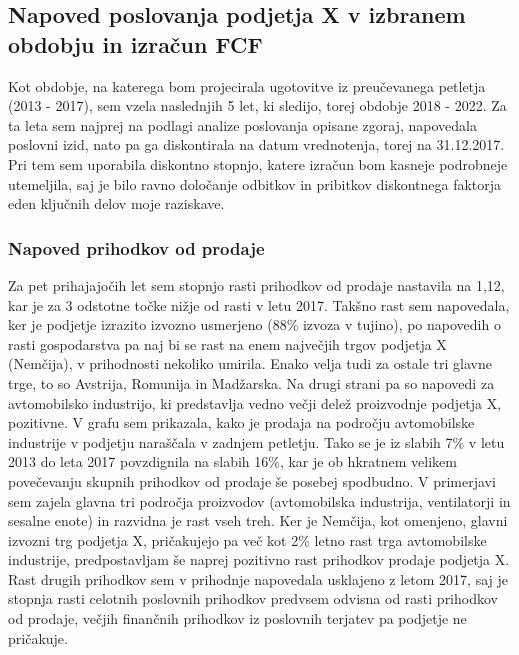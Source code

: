 \documentclass[12pt,a4paper]{amsart}
\theoremstyle{definition} %
\theoremstyle{plain} %
\begin{document}


\subsection{Napoved poslovanja podjetja X v izbranem obdobju in izračun FCF}

Kot obdobje, na katerega bom projecirala ugotovitve iz preučevanega petletja (2013 - 2017), sem vzela naslednjih 5 let, ki sledijo, torej obdobje 2018 - 2022. Za ta leta sem najprej na podlagi analize poslovanja opisane zgoraj, napovedala poslovni izid, nato pa ga diskontirala na datum vrednotenja, torej na 31.12.2017. Pri tem sem uporabila diskontno stopnjo, katere izračun bom kasneje podrobneje utemeljila, saj je bilo ravno določanje odbitkov in pribitkov diskontnega faktorja eden ključnih delov moje raziskave.

\subsubsection{Napoved prihodkov od prodaje}
Za pet prihajajočih let sem stopnjo rasti prihodkov od prodaje nastavila na 1,12, kar je za 3 odstotne točke nižje od rasti v letu 2017. Takšno rast sem napovedala, ker je podjetje izrazito izvozno usmerjeno (88\% izvoza v tujino), po napovedih o rasti gospodarstva pa naj bi se rast na enem največjih trgov podjetja X (Nemčija), v prihodnosti nekoliko umirila. Enako velja tudi za ostale tri glavne trge, to so Avstrija, Romunija in Madžarska. Na drugi strani pa so napovedi za avtomobilsko industrijo, ki predstavlja vedno večji delež proizvodnje podjetja X, pozitivne. V grafu sem prikazala, kako je prodaja na področju avtomobilske industrije v podjetju naraščala v zadnjem petletju. Tako se je iz slabih 7\% v letu 2013 do leta 2017 povzdignila na slabih 16\%, kar je ob hkratnem velikem povečevanju skupnih prihodkov od prodaje še posebej spodbudno. V primerjavi sem zajela glavna tri področja proizvodov (avtomobilska industrija, ventilatorji in sesalne enote) in razvidna je rast vseh treh. Ker je Nemčija, kot omenjeno, glavni izvozni trg podjetja X, pričakujejo pa več kot 2\% letno rast trga avtomobilske industrije, predpostavljam še naprej pozitivno rast prihodkov prodaje podjetja X. Rast drugih prihodkov sem v prihodnje napovedala usklajeno z letom 2017, saj je stopnja rasti celotnih poslovnih prihodkov predvsem odvisna od rasti prihodkov od prodaje, večjih finančnih prihodkov iz poslovnih terjatev pa podjetje ne pričakuje.
\end{document}
